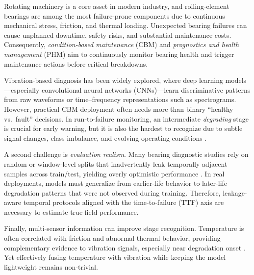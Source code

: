 \documentclass{article}
\begin{document}
Rotating machinery is a core asset in modern industry, and rolling-element bearings are among the most failure-prone components due to continuous mechanical stress, friction, and thermal loading. Unexpected bearing failures can cause unplanned downtime, safety risks, and substantial maintenance costs. Consequently, \emph{condition-based maintenance} (CBM) and \emph{prognostics and health management} (PHM) aim to continuously monitor bearing health and trigger maintenance actions before critical breakdowns.

Vibration-based diagnosis has been widely explored, where deep learning models---especially convolutional neural networks (CNNs)---learn discriminative patterns from raw waveforms or time--frequency representations such as spectrograms. However, practical CBM deployment often needs more than binary ``healthy vs.\ fault'' decisions. In run-to-failure monitoring, an intermediate \emph{degrading} stage is crucial for early warning, but it is also the hardest to recognize due to subtle signal changes, class imbalance, and evolving operating conditions \cite{jung2024dib_rtf}.

A second challenge is \emph{evaluation realism}. Many bearing diagnostic studies rely on random or window-level splits that inadvertently leak temporally adjacent samples across train/test, yielding overly optimistic performance \cite{wheat2024leakage,vieira2024realistic}. In real deployments, models must generalize from earlier-life behavior to later-life degradation patterns that were not observed during training. Therefore, leakage-aware temporal protocols aligned with the time-to-failure (TTF) axis are necessary to estimate true field performance.

Finally, multi-sensor information can improve stage recognition. Temperature is often correlated with friction and abnormal thermal behavior, providing complementary evidence to vibration signals, especially near degradation onset \cite{huang2023esrel_tempvib}. Yet effectively fusing temperature with vibration while keeping the model lightweight remains non-trivial.
\end{document}
